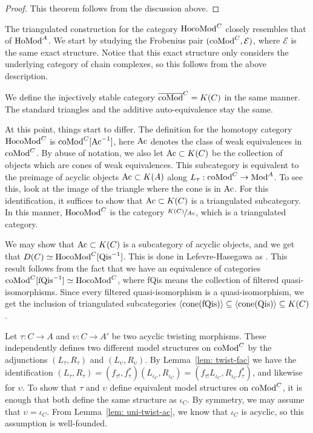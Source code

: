 \documentclass[../thesis.tex]{subfiles}
\begin{document}
            \begin{proof}
                This theorem follows from the discussion above.
            \end{proof}

            The triangulated construction for the category $\tt{Ho} \tt{coMod}^C$ closely resembles that of $\tt{Ho} \tt{Mod}^A$. We start by studying the Frobenius pair $(\tt{coMod}^C, \mathcal{E})$, where $\mathcal{E}$ is the same exact structure. Notice that this exact structure only considers the underlying category of chain complexes, so this follows from the above description.

            We define the injectively stable category $\overline{\tt{coMod}}^C = K(C)$ in the same manner. The standard triangles and the additive auto-equivalence stay the same.

            At this point, things start to differ. The definition for the homotopy category $\tt{Ho} \tt{coMod}^C$ is $\tt{coMod}^C[\tt{Ac}^{-1}]$, here $\tt{Ac}$ denotes the class of weak equivalences in $\tt{coMod}^C$. By abuse of notation, we also let $\tt{Ac}\subset K(C)$ be the collection of objects which are cones of weak equivalences. This subcategory is equivalent to the preimage of acyclic objects $\tt{Ac}\subset K(A)$ along $L_\tau: \tt{coMod}^C \rightarrow \tt{Mod}^A$. To see this, look at the image of the triangle where the cone is in $\tt{Ac}$. For this identification, it suffices to show that $\tt{Ac}\subset K(C)$ is a triangulated subcategory. In this manner, $\tt{Ho} \tt{coMod}^C$ is the category $\sfrac{K(C)}{Ac}$, which is a triangulated category.

            \begin{remark}
                We may show that $\tt{Ac}\subset K(C)$ is a subcategory of acyclic objects, and we get that $D(C) \simeq \tt{Ho} \tt{coMod}^C[\tt{Qis}^{-1}]$. This is done in Lefevre-Hasegawa as \cite[Proposition 1.3.5.1][51]{LefevreHasegawa03} \cite[Lemma 2.2.2.11][75]{LefevreHasegawa03}. This result follows from the fact that we have an equivalence of categories $\tt{coMod}^C[\tt{fQis}^{-1}]\simeq \tt{Ho} \tt{coMod}^C$, where fQis means the collection of filtered quasi-isomorphisms. Since every filtered quasi-isomorphism is a quasi-isomorphism, we get the inclusion of triangulated subcategories $\langle \tt{cone}(\tt{fQis})\rangle \subseteq \langle \tt{cone}(\tt{Qis})\rangle \subseteq K(C)$.
            \end{remark}

            Let $\tau: C \rightarrow A$ and $\upsilon: C \rightarrow A'$ be two acyclic twisting morphisms. These independently defines two different model structures on $\tt{coMod}^C$ by the adjunctions $(L_\tau, R_\tau)$ and $(L_\upsilon, R_\upsilon)$. By Lemma~\ref{lem: twist-fac} we have the identification $(L_\tau, R_\tau) = (f_{\tau !},f_\tau^*)(L_{\iota_C},R_{\iota_C}) = (f_{\tau !}L_{\iota_C},R_{\iota_C}f_\tau^*)$, and likewise for $\upsilon$. To show that $\tau$ and $\upsilon$ define equivalent model structures on $\tt{coMod}^C$, it is enough that both define the same structure as $\iota_C$. By symmetry, we may assume that $\upsilon = \iota_C$. From Lemma~\ref{lem: uni-twist-ac}, we know that $\iota_C$ is acyclic, so this assumption is well-founded.
\end{document}
